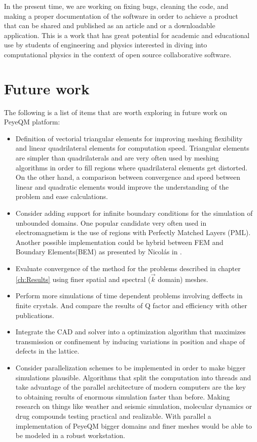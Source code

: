In the present time, we are working on fixing bugs, cleaning the code, and making a proper documentation of the software in order to achieve a product that can be shared and published as an article and or a downloadable application. This is a work that has great potential for academic and educational use by students of engineering and physics interested in diving into computational physics in the context of open source collaborative software.  
 

\section{Future work}
The following is a list of items that are worth exploring in future work on PeyeQM platform:
\begin{itemize}
\item Definition of vectorial triangular elements for improving meshing flexibility and linear quadrilateral elements for computation speed. Triangular elements are simpler than quadrilaterals and are very often used by meshing algorithms in order to fill regions where quadrilateral elements get distorted. On the other hand, a comparison between convergence and speed between linear and quadratic elements would improve the understanding of the problem and ease calculations.
\item Consider adding support for infinite boundary conditions for the simulation of unbounded domains. One popular candidate very often used in electromagnetism is the use of regions with Perfectly Matched Layers (PML)\cite{Jin2010}. Another possible implementation could be hybrid between FEM and Boundary Elements(BEM) as presented by Nicolás in \cite{Guarin2012}. 
\item Evaluate convergence of the method for the problems described in chapter \ref{ch:Results} using finer spatial and spectral ($\vec{k}$ domain) meshes.
\item Perform more simulations of time dependent problems involving deffects in finite crystals. And compare the results of Q factor and efficiency with other publications.
\item Integrate the CAD and solver into a optimization algorithm that maximizes transmission or confinement by inducing variations in position and shape of defects in the lattice.
\item Consider parallelization schemes to be implemented in order to make bigger simulations plausible. Algorithms that split the computation into threads and take advantage of the parallel architecture of modern computers are the key to obtaining results of enormous simulation faster than before. Making research on things like weather and seismic simulation, molecular dynamics or drug compounds testing practical and realizable. With parallel  a implementation of PeyeQM bigger domains and finer meshes would be able to be modeled in a robust workstation.
\end{itemize}



